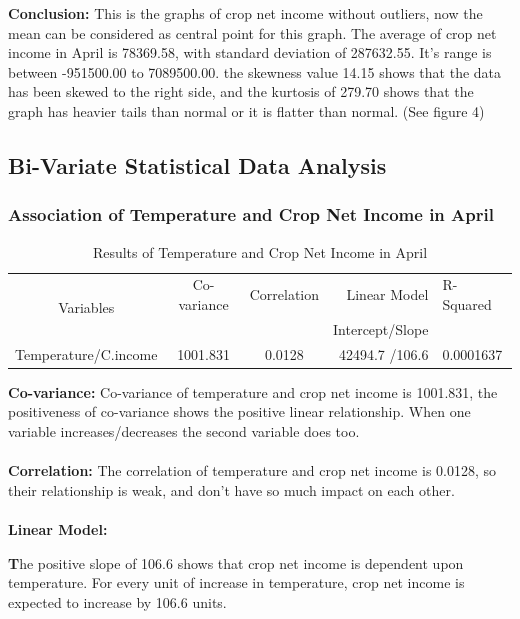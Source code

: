 \documentclass[12pt, a4paper]{article}
\begin{document}
\justify
\textbf{Conclusion: } This is the graphs of crop net income without outliers, now the mean can be considered as central point for this graph. The average of crop net income in April is 78369.58, with standard deviation of 287632.55. It's range is between -951500.00 to 7089500.00. the skewness value 14.15 shows that the data has been skewed to the right side, and the kurtosis of 279.70 shows that the graph has heavier tails than normal or it is flatter than normal. (See figure 4)

\subsection{Bi-Variate Statistical Data Analysis}
\subsubsection{Association of Temperature and Crop Net Income in April}

\begin{table}[h]
\begin{center}
\caption{Results of Temperature and Crop Net Income in April}
\begin{tabular}{|c|c|c|r|l|}
	\hline
     \multirow{2}{*}{Variables} & Co-variance & Correlation & 
     Linear Model & R-Squared \\ & & & Intercept/Slope & \\
     \hline
     \hline
     Temperature/C.income  &1001.831 & 0.0128 & 42494.7 /106.6   & 0.0001637 \\
     \hline
\end{tabular}
\end{center}
\end{table}
\justify
\textbf{Co-variance:} Co-variance of temperature and crop net income is 1001.831, the positiveness of co-variance shows the positive linear relationship. When one variable increases/decreases the second variable does too. \\
\\
\textbf{Correlation:} The correlation of temperature and crop net income is 0.0128, so their relationship is weak, and don't have so much impact on each other.\\
\\
\textbf{Linear Model: } 

\item \textbf The positive slope of 106.6 shows that crop net income is dependent upon temperature. For every unit of increase in temperature, crop net income is expected to increase by 106.6 units.
\end{document}
